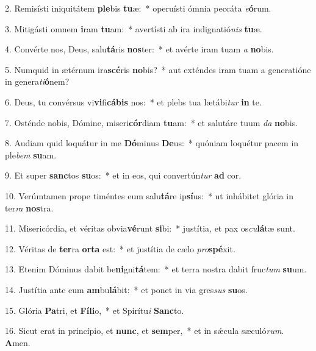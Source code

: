 2. Remisísti iniquitátem \textbf{ple}bis \textbf{tu}æ:~*  operuísti ómnia peccáta \textit{e}\textbf{ó}rum.\

3. Mitigásti omnem \textbf{i}ram \textbf{tu}am:~*  avertísti ab ira indignatió\textit{nis} \textbf{tu}æ.\

4. Convérte nos, Deus, salu\textbf{tá}ris \textbf{nos}ter:~*  et avérte iram tuam \textit{a} \textbf{no}bis.\

5. Numquid in ætérnum ira\textbf{scé}ris \textbf{no}bis?~*  aut exténdes iram tuam a generatióne in genera\textit{ti}\textbf{ó}nem?\

6. Deus, tu convérsus vi\textbf{vi}fi\textbf{cá}\textbf{bis} nos:~*  et plebs tua lætábi\textit{tur} \textbf{in} te.\

7. Osténde nobis, Dómine, miseri\textbf{cór}diam \textbf{tu}am:~*  et salutáre tuum \textit{da} \textbf{no}bis.\

8. Audiam quid loquátur in me \textbf{Dó}minus \textbf{De}us:~*  quóniam loquétur pacem in ple\textit{bem} \textbf{su}am.\

9. Et super \textbf{sanc}tos \textbf{su}os:~*  et in eos, qui convertún\textit{tur} \textbf{ad} cor.\

10. Verúmtamen prope timéntes eum salu\textbf{tá}re ip\textbf{sí}us:~*  ut inhábitet glória in ter\textit{ra} \textbf{nos}tra.\

11. Misericórdia, et véritas obvia\textbf{vé}runt \textbf{si}bi:~*  justítia, et pax os\textit{cu}\textbf{lá}tæ sunt.\

12. Véritas de \textbf{ter}ra \textbf{or}\textbf{ta} est:~*  et justítia de cælo \textit{pro}\textbf{spé}xit.\

13. Etenim Dóminus dabit be\textbf{ni}gni\textbf{tá}tem:~*  et terra nostra dabit fruc\textit{tum} \textbf{su}um.\

14. Justítia ante eum \textbf{am}bu\textbf{lá}bit:~*  et ponet in via gres\textit{sus} \textbf{su}os.\

15. Glória \textbf{Pa}tri, et \textbf{Fí}\textbf{li}o,~*  et Spirítu\textit{i} \textbf{Sanc}to.\

16. Sicut erat in princípio, et \textbf{nunc}, et \textbf{sem}per,~*  et in sǽcula sæculó\textit{rum}. \textbf{A}men.\

